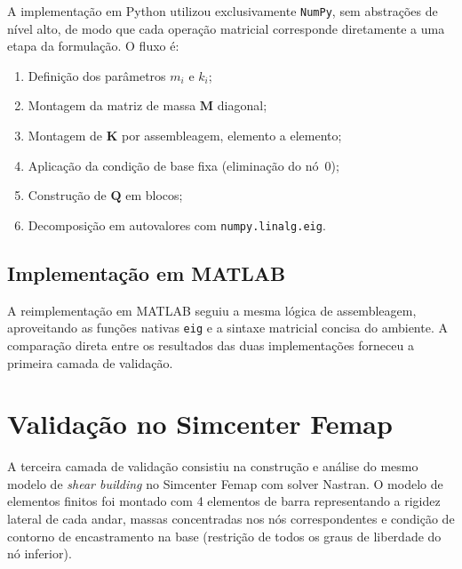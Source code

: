 \documentclass[12pt, a4paper, oneside]{article}
\numberwithin{equation}{section}
\numberwithin{figure}{section}
\numberwithin{table}{section}
\newcommand{\mat}[1]{\mathbf{#1}}
\begin{document}
A implementação em Python utilizou exclusivamente \texttt{NumPy}, sem
abstrações de nível alto, de modo que cada operação matricial corresponde
diretamente a uma etapa da formulação. O fluxo é:

\begin{enumerate}
  \item Definição dos parâmetros $m_i$ e $k_i$;
  \item Montagem da matriz de massa $\mat{M}$ diagonal;
  \item Montagem de $\mat{K}$ por assembleagem, elemento a elemento;
  \item Aplicação da condição de base fixa (eliminação do nó~0);
  \item Construção de $\mat{Q}$ em blocos;
  \item Decomposição em autovalores com \texttt{numpy.linalg.eig}.
\end{enumerate}



\subsection{Implementação em MATLAB}

A reimplementação em MATLAB seguiu a mesma lógica de assembleagem, aproveitando
as funções nativas \texttt{eig} e a sintaxe matricial concisa do ambiente. A
comparação direta entre os resultados das duas implementações forneceu a
primeira camada de validação.



\section{Validação no Simcenter Femap}

A terceira camada de validação consistiu na construção e análise do mesmo
modelo de \textit{shear building} no Simcenter Femap com solver Nastran. O
modelo de elementos finitos foi montado com 4 elementos de barra representando
a rigidez lateral de cada andar, massas concentradas nos nós correspondentes
e condição de contorno de encastramento na base (restrição de todos os graus
de liberdade do nó inferior).
\end{document}
